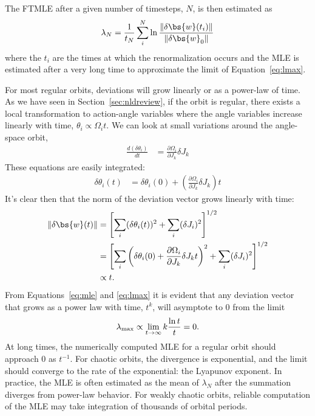 The FTMLE after a given number of timesteps, $N$, is then estimated as
\begin{equation}
	\lambda_N = \frac{1}{t_N}\sum_i^N \ln \frac{\|\delta \bs{w}(t_i)\|}{\|\delta \bs{w}_0\|} \label{eq:ftmle}
\end{equation}
where the $t_i$ are the times at which the renormalization occurs and the MLE is estimated after a very long time to approximate the limit of Equation~\ref{eq:lmax}.

For most regular orbits, deviations will grow linearly or as a power-law of time. As we have seen in Section~\ref{sec:nldreview}, if the orbit is regular, there exists a local transformation to action-angle variables where the angle variables increase linearly with time, $\theta_i \propto \Omega_i t$. We can look at small variations around the angle-space orbit,
\begin{align}
	\frac{d (\delta \theta_i)}{dt} &= \frac{\partial \Omega_i}{\partial J_k} \delta J_k
\end{align}
These equations are easily integrated:
\begin{align}
	\delta \theta_i(t) &= \delta \theta_i(0) + \left(\frac{\partial \Omega_i}{\partial J_k} \delta J_k \right) t
\end{align}
It's clear then that the norm of the deviation vector grows linearly with time:
\begin{align}
	\|\delta \bs{w}(t)\| &= \left[\sum_i (\delta \theta_i(t))^2 + \sum_i (\delta J_i)^2\right]^{1/2}\\
	&= \left[\sum_i \left(\delta \theta_i(0) + \frac{\partial \Omega_i}{\partial J_k} \delta J_k t\right)^2 + \sum_i (\delta J_i)^2\right]^{1/2}\\
	&\propto t.
\end{align}
From Equations~\ref{eq:mle} and \ref{eq:lmax} it is evident that any deviation vector that grows as a power law with time, $t^k$, will asymptote to 0 from the limit 
\begin{equation}
	\lambda_{\rm max} \propto \lim_{t\rightarrow \infty} k \frac{\ln t}{t} = 0.
\end{equation}
At long times, the numerically computed MLE for a regular orbit should approach 0 as $t^{-1}$. For chaotic orbits, the divergence is exponential, and the limit should converge to the rate of the exponential: the Lyapunov exponent. In practice, the MLE is often estimated as the mean of $\lambda_N$ after the summation diverges from power-law behavior. For weakly chaotic orbits, reliable computation of the MLE may take integration of thousands of orbital periods.


